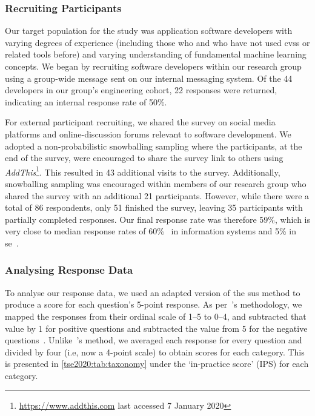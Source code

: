 \subsubsection{Recruiting Participants}

Our target population for the study was application software developers with varying degrees of experience (including those who and who have not used \glspl{cvs} or related tools before) and varying understanding of fundamental machine learning concepts. We began by recruiting software developers within our research group using a group-wide message sent on our internal messaging system. Of the 44 developers in our group's engineering cohort, 22 responses were returned, indicating an internal response rate of 50\%.

For external participant recruiting, we shared the survey on social media platforms and online-discussion forums relevant to software development. We adopted a non-probabilistic snowballing sampling where the participants, at the end of the survey, were encouraged to share the survey link to others using \textit{AddThis}\footnote{\url{https://www.addthis.com} last accessed 7 January 2020}. This resulted in 43 additional visits to the survey. Additionally, snowballing sampling was encouraged within members of our research group who shared the survey with an additional 21 participants. However, while there were a total of 86 respondents, only 51 finished the survey, leaving 35 participants with partially completed responses. Our final response rate was therefore 59\%, which is very close to median response rates of 60\%~\citep{Baruch:1999vf} in information systems and 5\% in \gls{se}~\citep{Singer:2007tu}.

\subsubsection{Analysing Response Data}
\label{tse2020:sec:validation:survey:analysis}

To analyse our response data, we used an adapted version of the \gls{sus} method to produce a score for each question's 5-point response. As per~\citeauthor{Brooke:1996ua}'s methodology, we mapped the responses from their ordinal scale of 1--5 to 0--4, and subtracted that value by 1 for positive questions and subtracted the value from 5 for the negative questions~\citep{Brooke:1996ua}. Unlike~\citeauthor{Brooke:1996ua}'s method, we averaged each response for every question and divided by four (i.e, now a 4-point scale) to obtain scores for each category. This is presented in \cref{tse2020:tab:taxonomy} under the `in-practice score' (IPS) for each category.

